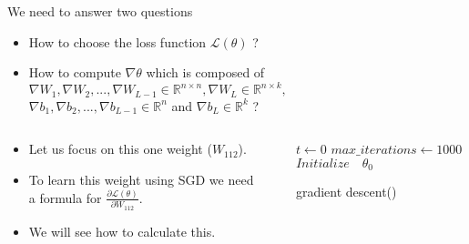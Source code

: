 \savestack{\figuretwo}{}
\savestack{\figurethree}{}

\begin{frame}
\end{frame}

\begin{frame}
  \begin{block}{We need to answer two questions}
    \begin{itemize}
      \justifying
      \item How to choose the loss function $\mathscr{L}(\theta)$ ?
      \item \alert<2->{How to compute $\nabla \theta$ which is composed of $\nabla W_1, \nabla W_2, ..., \nabla W_{L-1} \in \mathbb{R}^{n \times n}, \nabla W_{L} \in \mathbb{R}^{n \times k},$ \\ $\nabla b_1, \nabla b_2, ..., \nabla b_{L-1} \in \mathbb{R}^n $ and $\nabla b_{L} \in \mathbb{R}^k$ ?}
    \end{itemize}
  \end{block}
\end{frame}

\begin{frame}
  \begin{columns}
    \begin{overlayarea}{\textwidth}{\textheight}
      \begin{itemize}
        \justifying
        \item<1-> Let us focus on this one weight ($W_{112}$).
        \item<2-> To learn this weight using SGD we need a formula for $\frac{\partial \mathscr{L}(\theta)}{ \partial W_{112}}$.
        \item<3-> We will see how to calculate this.
      \end{itemize}
    \end{overlayarea}


    \begin{overlayarea}{\textwidth}{\textheight}
      \makebox[\textwidth][c]{\usebox{\figuretwocontent}}
    \end{overlayarea}

    \begin{overlayarea}{\textwidth}{\textheight}
      \begin{algorithm}[H]
        \SetAlgoLined
        $t \leftarrow 0$\;
        $max\_iterations\leftarrow 1000$\;
        $Initialize \quad \theta_0$\;
        \color{black}
        \caption{gradient descent()}
      \end{algorithm}
    \end{overlayarea}
  \end{columns}
\end{frame}

